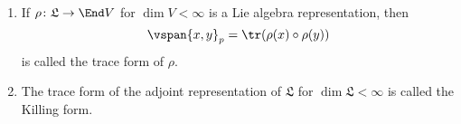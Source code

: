 \begin{enumerate}[label=(\alph*)]
	\item If $\rho\colon \mathfrak{L}\to\End V$ for $\dim V<\infty$ is a Lie algebra
representation, then
		\[ \vspan{x, y}_p = \tr (\rho(x) \circ \rho(y)) \]
		is called the trace form of $\rho$.

	\item The trace form of the adjoint representation of $\mathfrak{L}$
		for $\dim \mathfrak{L} < \infty$ is called the Killing form.
\end{enumerate}
